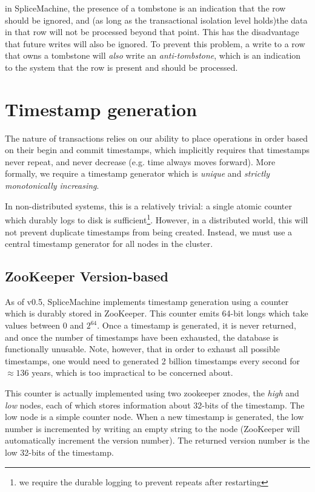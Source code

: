 in SpliceMachine, the presence of a tombstone is an indication that the row should be ignored, and (as long as the transactional isolation level holds)the data in that row will not be processed beyond that point. This has the disadvantage that future writes will also be ignored. To prevent this problem, a write to a row that owns a tombstone will \emph{also} write an \emph{anti-tombstone}, which is an indication to the system that the row is present and should be processed.

\section{Timestamp generation}
The nature of transactions relies on our ability to place operations in order based on their begin and commit timestamps, which implicitly requires that timestamps never repeat, and never decrease (e.g. time always moves forward). More formally, we require a timestamp generator which is \emph{unique} and \emph{strictly monotonically increasing}. 

In non-distributed systems, this is a relatively trivial: a single atomic counter which durably logs to disk is sufficient\footnote{we require the durable logging to prevent repeats after restarting}. However, in a distributed world, this will not prevent duplicate timestamps from being created. Instead, we must use a central timestamp generator for all nodes in the cluster.

\subsection{ZooKeeper Version-based}
As of v0.5, SpliceMachine implements timestamp generation using a counter which is durably stored in ZooKeeper. This counter emits 64-bit longs which take values between 0 and $2^{64}$. Once a timestamp is generated, it is never returned, and once the number of timestamps have been exhausted, the database is functionally unusable. Note, however, that in order to exhaust all possible timestamps, one would need to generated 2 billion timestamps every second for $\approx 136$ years, which is too impractical to be concerned about.

This counter is actually implemented using two zookeeper znodes, the \emph{high} and \emph{low} nodes, each of which stores information about 32-bits of the timestamp. The low node is a simple counter node. When a new timestamp is generated, the low number is incremented by writing an empty string to the node (ZooKeeper will automatically increment the version number). The returned version number is the low 32-bits of the timestamp. 


